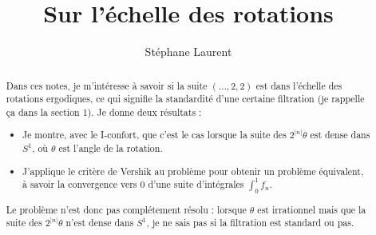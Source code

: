 \documentclass[12pt,a4paper]{article}
\author{Stéphane Laurent}
\title{Sur l'échelle des rotations}
\begin{document}
\theoremstyle{defstyle}
\newtheorem{definition}{Definition}
\newtheorem{remark}{Remark}
\newtheorem{question}{Question}
\newtheorem{clarify}{To clarify}
\theoremstyle{thmstyle}
\newtheorem{thm}{Theorem}[section]
\newtheorem{ppsition}{Proposition}
\newtheorem{lemme}{Lemme}

\newcommand{\BB}{\mathcal{B}}
\newcommand{\FF}{\mathcal{F}}
\newcommand{\GG}{\mathcal{G}}
\newcommand{\EE}{\mathbb{E}}
\newcommand{\II}{\mathcal{I}}
\newcommand{\LL}{\mathcal{L}}
\newcommand{\OO}{\mathcal{O}}
\newcommand{\R}{\mathbb{R}}
\newcommand{\XX}{\mathcal{X}}
\newcommand{\T}{\mathbb{T}}
\newcommand{\Z}{\mathbb{Z}}
\newcommand{\given}{\mid}
\newcommand{\eps}{\epsilon}
\newcommand{\indic}{\boldsymbol 1}
\newcommand{\Vb}{\boldsymbol V}

\newcommand{\indvee}{\dot{\vee}}
\newcommand{\indep}{\mathrel{\text{\scalebox{1.07}{$\perp\mkern-10mu\perp$}}}}

\newcommand{\disp}{\textrm{disp}\,}
\newcommand{\dd}{\mathrm{d}}


\maketitle

\begin{abstract}
Dans ces notes, je m'intéresse à savoir si la suite $(\ldots, 2, 2)$ est dans l'échelle des rotations ergodiques, ce qui signifie la standardité d'une certaine filtration (je rappelle ça dans la section 1). 
Je donne deux résultats :
\begin{itemize}
\item Je montre, avec le I-confort, que c'est le cas lorsque la suite des $2^{|n|}\theta$ est dense dans $S^1$, où $\theta$ est l'angle de la rotation. 
\item J'applique le critère de Vershik au problème pour obtenir un problème équivalent, à savoir la convergence vers $0$ d'une suite d'intégrales $\int_0^1 f_n$. 
\end{itemize}
Le problème n'est donc pas complétement résolu : lorsque $\theta$ est irrationnel mais que la suite des $2^{|n|}\theta$ n'est dense dans $S^1$, je ne sais pas si la filtration est standard ou pas. 
\end{abstract}

\end{document}
